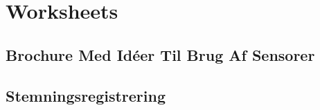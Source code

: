 






















\part{Worksheets}





\newpage

\newpage

\appendix



\chapter{Brochure Med Idéer Til Brug Af Sensorer}\label{app:brochure}
 

\chapter{Stemningsregistrering}


